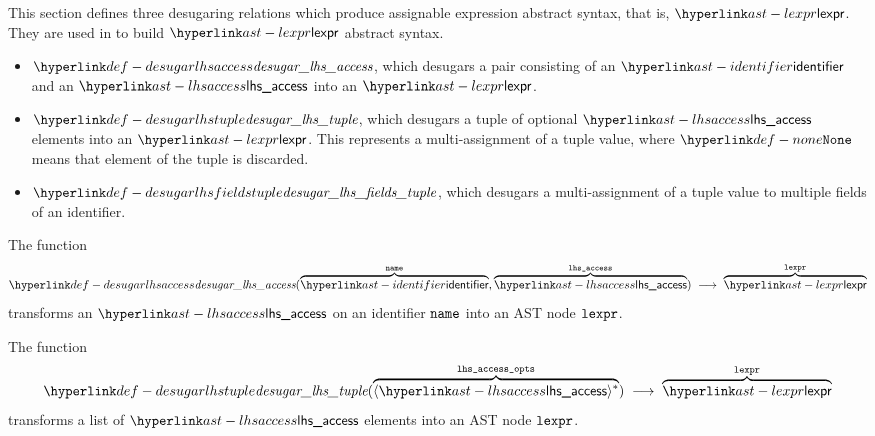 This section defines three desugaring relations which produce assignable expression abstract syntax, that is, $\lexpr$.
They are used in  to build $\lexpr$ abstract syntax.
\begin{itemize}
  \item $\desugarlhsaccess$, which desugars a pair consisting of an $\identifier$ and an $\lhsaccess$ into an $\lexpr$.
  \item $\desugarlhstuple$, which desugars a tuple of optional $\lhsaccess$ elements into an $\lexpr$.
    This represents a multi-assignment of a tuple value, where $\None$ means that element of the tuple is discarded.
  \item $\desugarlhsfieldstuple$, which desugars a multi-assignment of a tuple value to multiple fields of an identifier.
\end{itemize}

\hypertarget{def-desugarlhsaccess}{}
The function
\[
  \desugarlhsaccess(\overname{\identifier}{\name}, \overname{\lhsaccess}{\vlhsaccess}) \;\aslto\; \overname{\lexpr}{\vlexpr}
\]
transforms an $\lhsaccess$ on an identifier $\name$ into an AST node $\vlexpr$.

\begin{mathpar}
\end{mathpar}

\hypertarget{def-desugarlhstuple}{}
The function
\[
  \desugarlhstuple(\overname{\langle\lhsaccess\rangle^*}{\vlhsaccessopts}) \;\aslto\; \overname{\lexpr}{\vlexpr}
\]
transforms a list of \optional{} $\lhsaccess$ elements into an AST node $\vlexpr$. \\

